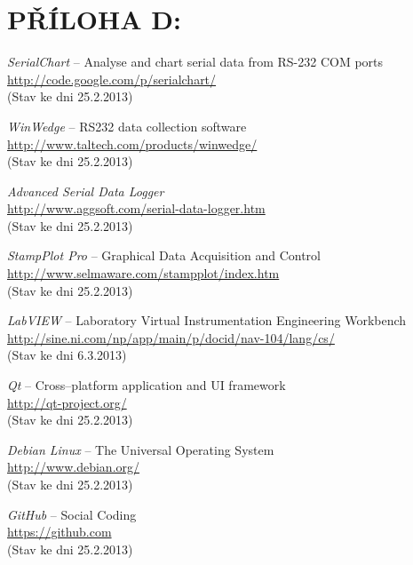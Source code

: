 \documentclass[12pt, a4paper, oneside]{article}
\newcommand{\It}{\textit}  %
\begin{document}
 \section*{PŘÍLOHA D:}
 \begin{thebibliography}{99}

     \It{SerialChart} -- Analyse and chart serial data from RS-232 COM ports \\
    \url{http://code.google.com/p/serialchart/}\\
    (Stav ke dni 25.2.2013)

     \It{WinWedge} -- RS232 data collection software \\
    \url{http://www.taltech.com/products/winwedge/}\\
    (Stav ke dni 25.2.2013)

     \It{Advanced Serial Data Logger} \\
    \url{http://www.aggsoft.com/serial-data-logger.htm}\\
    (Stav ke dni 25.2.2013)

     \It{StampPlot Pro} -- Graphical Data Acquisition and Control \\
    \url{http://www.selmaware.com/stampplot/index.htm}\\
    (Stav ke dni 25.2.2013)

     \It{LabVIEW} -- Laboratory Virtual Instrumentation Engineering Workbench \\
    \url{http://sine.ni.com/np/app/main/p/docid/nav-104/lang/cs/}\\
    (Stav ke dni 6.3.2013)

     \It{Qt} -- Cross--platform application and UI framework \\
    \url{http://qt-project.org/}\\
    (Stav ke dni 25.2.2013)

     \It{Debian Linux} -- The Universal Operating System \\
    \url{http://www.debian.org/}\\
    (Stav ke dni 25.2.2013)

     \It{GitHub} -- Social Coding \\
    \url{https://github.com}\\
    (Stav ke dni 25.2.2013)


\end{thebibliography}
\end{document}
